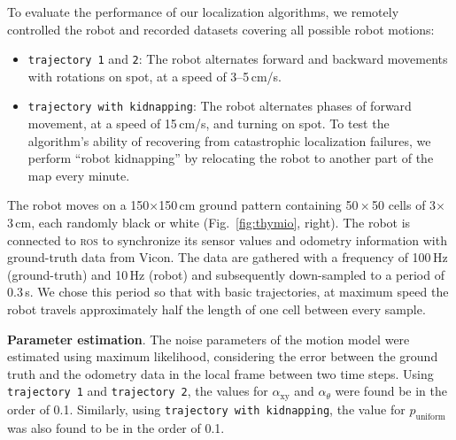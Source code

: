 \documentclass{svmult}
\newcommand{\fig}[1]{Fig.~\ref{fig:#1}}
\begin{document}
To evaluate the performance of our localization algorithms, we remotely controlled the robot and recorded datasets covering all possible robot motions:
\begin{itemize}
\item \texttt{trajectory 1} and \texttt{2}: The robot alternates forward and backward movements with rotations on spot, at a speed of 3--5\,cm/s. %
\item \texttt{trajectory with kidnapping}: The robot alternates phases of forward movement, at a speed of 15\,cm/s, and turning on spot.
To test the algorithm's ability of recovering from catastrophic localization failures, we perform ``robot kidnapping'' by relocating the robot to another part of the map every minute.
\end{itemize}
The robot moves on a 150$\times$150\,cm ground pattern containing 50\,$\times$\,50 cells of 3$\times$3\,cm, each randomly black or white (\fig{thymio}, right).
The robot is connected to \textsc{ros} to synchronize its sensor values and odometry information with ground-truth data from Vicon.
The data are gathered with a frequency of 100\,Hz (ground-truth) and 10\,Hz (robot) and subsequently down-sampled to a period of 0.3\,s.
We chose this period so that with basic trajectories, at maximum speed the robot travels approximately half the length of one cell between every sample.

\label{sec:mle}

\textbf{Parameter estimation}.
The noise parameters of the motion model were estimated using maximum likelihood, considering the error between the ground truth and the odometry data in the local frame between two time steps.
Using \texttt{trajectory~1} and \texttt{trajectory~2}, the values for  $\alpha_\mathrm{xy}$ and $\alpha_\theta$ were found be in the order of 0.1.
Similarly, using \texttt{trajectory with kidnapping}, the value for $p_\mathrm{uniform}$ was also found to be in the order of 0.1.

\end{document}
